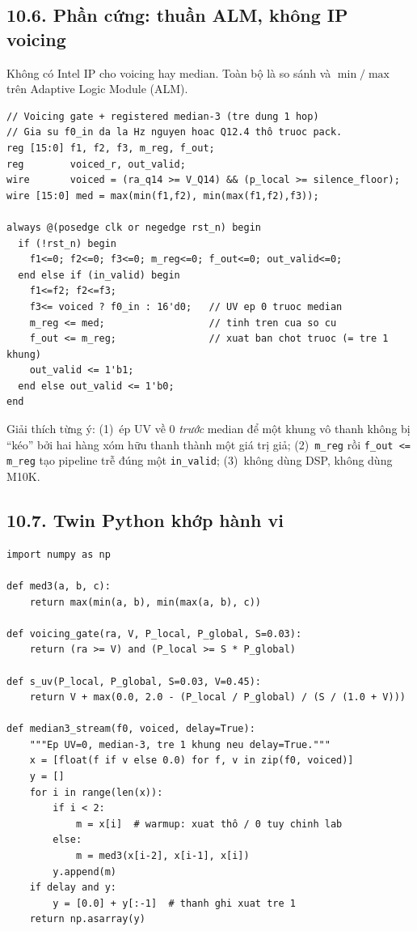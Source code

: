 \subsection*{10.6. Phần cứng: thuần ALM, không IP voicing}

Không có Intel IP cho voicing hay median. Toàn bộ là so sánh và $\min/\max$ trên Adaptive Logic Module (ALM).

\begin{verbatim}
// Voicing gate + registered median-3 (tre dung 1 hop)
// Gia su f0_in da la Hz nguyen hoac Q12.4 thô truoc pack.
reg [15:0] f1, f2, f3, m_reg, f_out;
reg        voiced_r, out_valid;
wire       voiced = (ra_q14 >= V_Q14) && (p_local >= silence_floor);
wire [15:0] med = max(min(f1,f2), min(max(f1,f2),f3));

always @(posedge clk or negedge rst_n) begin
  if (!rst_n) begin
    f1<=0; f2<=0; f3<=0; m_reg<=0; f_out<=0; out_valid<=0;
  end else if (in_valid) begin
    f1<=f2; f2<=f3;
    f3<= voiced ? f0_in : 16'd0;   // UV ep 0 truoc median
    m_reg <= med;                  // tinh tren cua so cu
    f_out <= m_reg;                // xuat ban chot truoc (= tre 1 khung)
    out_valid <= 1'b1;
  end else out_valid <= 1'b0;
end
\end{verbatim}

Giải thích từng ý: (1)~ép UV về $0$ \emph{trước} median để một khung vô thanh không bị ``kéo'' bởi hai hàng xóm hữu thanh thành một giá trị giả; (2)~\texttt{m\_reg} rồi \texttt{f\_out <= m\_reg} tạo pipeline trễ đúng một \texttt{in\_valid}; (3)~không dùng DSP, không dùng M10K.

\subsection*{10.7. Twin Python khớp hành vi}

\begin{verbatim}
import numpy as np

def med3(a, b, c):
    return max(min(a, b), min(max(a, b), c))

def voicing_gate(ra, V, P_local, P_global, S=0.03):
    return (ra >= V) and (P_local >= S * P_global)

def s_uv(P_local, P_global, S=0.03, V=0.45):
    return V + max(0.0, 2.0 - (P_local / P_global) / (S / (1.0 + V)))

def median3_stream(f0, voiced, delay=True):
    """Ep UV=0, median-3, tre 1 khung neu delay=True."""
    x = [float(f if v else 0.0) for f, v in zip(f0, voiced)]
    y = []
    for i in range(len(x)):
        if i < 2:
            m = x[i]  # warmup: xuat thô / 0 tuy chinh lab
        else:
            m = med3(x[i-2], x[i-1], x[i])
        y.append(m)
    if delay and y:
        y = [0.0] + y[:-1]  # thanh ghi xuat tre 1
    return np.asarray(y)
\end{verbatim}

